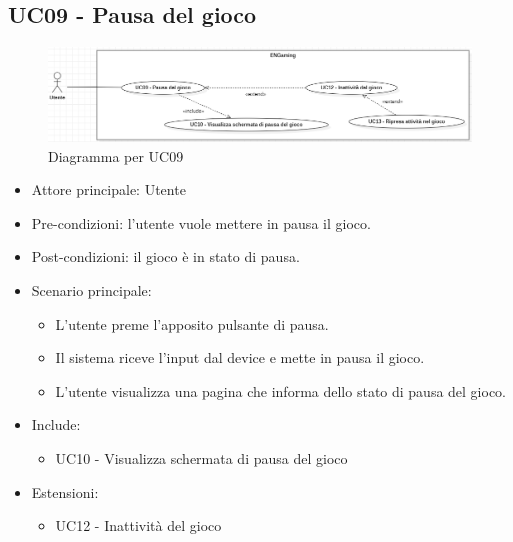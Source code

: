 \subsection{UC09 - Pausa del gioco}
\begin{figure}[h]
    \centering
    \includegraphics[width=400pt]{images/usecase/UC09.png}
    \caption{Diagramma per UC09}
    \label{fig:UC09}
\end{figure}
\begin{itemize}
    \item Attore principale: Utente
    \item Pre-condizioni: l'utente vuole mettere in pausa il gioco.
    \item Post-condizioni: il gioco è in stato di pausa.
    \item Scenario principale: \begin{itemize}
        \item L'utente preme l'apposito pulsante di pausa.
        \item Il sistema riceve l'input dal device e mette in pausa il gioco.
        \item L'utente visualizza una pagina che informa dello stato di pausa del gioco.
    \end{itemize}
    \item Include: \begin{itemize}
        \item UC10 - Visualizza schermata di pausa del gioco
    \end{itemize}
    \item Estensioni: \begin{itemize}
        \item UC12 - Inattività del gioco
    \end{itemize}
\end{itemize}

